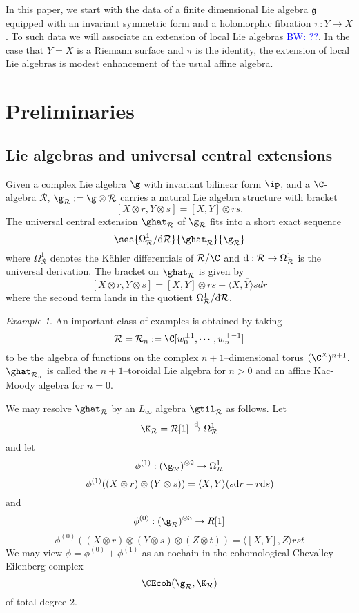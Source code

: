 \documentclass[12pt]{amsart}
\theoremstyle{definition}
\theoremstyle{remark}
\newtheorem{eg}[theorem]{Example}
\newcommand{\R}{\mathcal{R}}
\def\d{{\rm d}}
\def\fg{\mathfrak{g}}
\def\brian{\textcolor{blue}{BW: }\textcolor{blue}}
\begin{document}
In this paper, we start with the data of a finite dimensional Lie algebra $\fg$ equipped with an invariant symmetric form and a holomorphic fibration $\pi : Y \to X$. 
To such data we will associate an extension of local Lie algebras \brian{??}.
In the case that $Y = X$ is a Riemann surface and $\pi$ is the identity, the extension of local Lie algebras is modest enhancement of the usual affine algebra.


\section{Preliminaries}
\subsection{Lie algebras and universal central extensions}



Given a complex Lie algebra $\g$ with invariant bilinear form $\ip$, and a $\C$-algebra $\R$, $ \g_{\R} := \g \otimes \R$ carries a natural Lie algebra structure with bracket
\[
[X \otimes r, Y \otimes s] = [X,Y] \otimes rs.
\]
The universal central extension $\ghat_{\R}$ of $\g_{\R}$ fits into a short exact sequence
\[
\ses{\Omega^1_{\R} / \d \R}{\ghat_{\R}}{\g_{\R}}
\]
where $\Omega^1_{\R}$ denotes the K\"{a}hler differentials of $\R/\C$ and $\d: \R \rightarrow \Omega^{1}_{\R}$ is the universal derivation. The bracket on $\ghat_{\R}$ is given by 
\[
[X \otimes r, Y \otimes s] =  [X,Y] \otimes rs + \overline{\langle X, Y \rangle s dr}
\]
where the second term lands in the quotient $\Omega^1_{\R} / \d \R$. 

\begin{eg}

An important class of examples is obtained by taking
\[
\R= \R_n := \C[w^{\pm 1}_0, \cdots, w^{\pm -1}_n]
\]
to be the algebra of functions on the complex $n+1$--dimensional torus $(\C^{\times})^{n+1}$. $\ghat_{\R_n}$ is called the $n+1$--toroidal Lie algebra for $n >0$ and an affine Kac-Moody algebra for $n=0$. 

\end{eg}

We may resolve $\ghat_{\R}$ by an $L_{\infty}$ algebra $\gtil_{\R}$ as follows. Let 
\[
\K_{\R} = \R[1] \overset{\d}{\rightarrow} \Omega^{1}_{\R}
\]
and let
$$ \phi^{(1)}: (\g_{\R})^{\otimes 2} \rightarrow \Omega^1_{\R} $$
$$ \phi^{(1)} ((X \otimes r) \otimes (Y \otimes s)) = \langle X, Y \rangle (s \d r - r \d s) $$
and 
$$ \phi^{(0)}: (\g_{\R})^{\otimes 3} \rightarrow R[1] $$
$$ \phi^{(0)}( (X \otimes r)\otimes(Y \otimes s) \otimes (Z \otimes t)) = \langle [X,Y], Z \rangle rst $$
We may view $\phi = \phi^{(0)} + \phi^{(1)}$ as an cochain in the cohomological Chevalley-Eilenberg complex $$ \CEcoh(\g_{\R}, \K_{\R}) $$ of total degree $2$.
\end{document}
